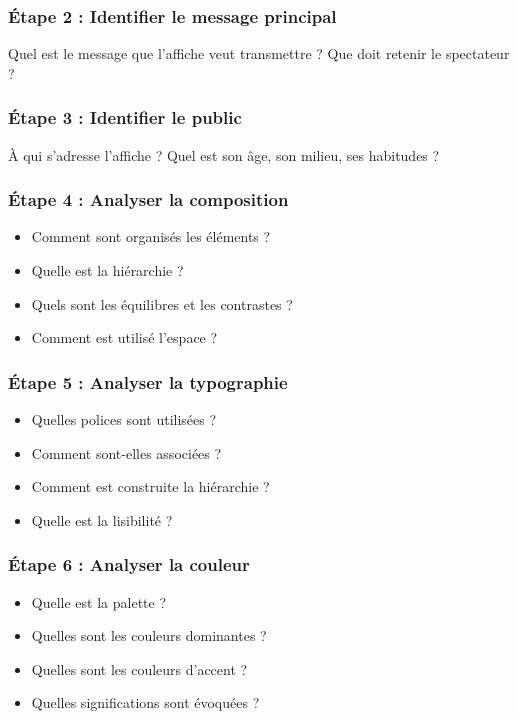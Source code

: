 \subsubsection{Étape 2 : Identifier le message principal}

Quel est le message que l'affiche veut transmettre ? Que doit retenir le spectateur ?

\subsubsection{Étape 3 : Identifier le public}

À qui s'adresse l'affiche ? Quel est son âge, son milieu, ses habitudes ?

\subsubsection{Étape 4 : Analyser la composition}

\begin{itemize}
    \item Comment sont organisés les éléments ?
    \item Quelle est la hiérarchie ?
    \item Quels sont les équilibres et les contrastes ?
    \item Comment est utilisé l'espace ?
\end{itemize}

\subsubsection{Étape 5 : Analyser la typographie}

\begin{itemize}
    \item Quelles polices sont utilisées ?
    \item Comment sont-elles associées ?
    \item Comment est construite la hiérarchie ?
    \item Quelle est la lisibilité ?
\end{itemize}

\subsubsection{Étape 6 : Analyser la couleur}

\begin{itemize}
    \item Quelle est la palette ?
    \item Quelles sont les couleurs dominantes ?
    \item Quelles sont les couleurs d'accent ?
    \item Quelles significations sont évoquées ?
\end{itemize}

